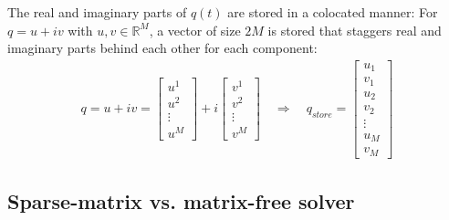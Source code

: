 \documentclass[11pt]{article}
\newcommand{\R}{\mathds{R}}
\begin{document}
The real and imaginary parts of $q(t)$ are stored in a colocated manner: For
  $q = u+iv$ with $u,v\in\R^{M}$, a vector of size $2M$ is stored that
  staggers real and imaginary parts behind each other for each component:
  \begin{align*}
    q = u+iv = \begin{bmatrix}
     u^1\\u^2\\ \vdots \\ u^{M} 
    \end{bmatrix}
    + i \begin{bmatrix}
     v^1\\v^2\\ \vdots \\ v^{M} 
    \end{bmatrix}
    \quad \Rightarrow \quad
    q_{store} = \begin{bmatrix}
      u_1 \\ v_1\\ u_2 \\ v_2 \\ \vdots \\ u_{M} \\ v_{M}
    \end{bmatrix}
  \end{align*}


 \subsection{Sparse-matrix vs. matrix-free solver}
\end{document}
